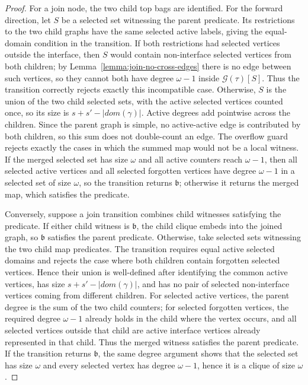 \documentclass[11pt,a4paper]{article}
\newcommand{\decompositiongraph}[1]{\mathcal{G}(#1)}
\newcommand{\abstractdecomposition}{\tau}
\newcommand{\domain}{dom}
\newcommand{\cliqueparameter}{\omega}
\newcommand{\cliquemap}{\gamma}
\newcommand{\cliquesize}{s}
\newcommand{\cliquefound}{\mathfrak{b}}
\newcommand{\vertexsub}{S}
\begin{document}
{\begin{proof}
					For a join node, the two child top bags are identified. For the forward direction, let $\vertexsub$ be a selected set witnessing the parent predicate. Its restrictions to the two child graphs have the same selected active labels, giving the equal-domain condition in the transition. If both restrictions had selected vertices outside the interface, then $\vertexsub$ would contain non-interface selected vertices from both children; by Lemma~\ref{lemma:join-no-cross-edges} there is no edge between such vertices, so they cannot both have degree $\cliqueparameter-1$ inside $\decompositiongraph{\abstractdecomposition}[\vertexsub]$. Thus the transition correctly rejects exactly this incompatible case. Otherwise, $\vertexsub$ is the union of the two child selected sets, with the active selected vertices counted once, so its size is $\cliquesize+\cliquesize'-|\domain(\cliquemap)|$. Active degrees add pointwise across the children. Since the parent graph is simple, no active-active edge is contributed by both children, so this sum does not double-count an edge. The overflow guard rejects exactly the cases in which the summed map would not be a local witness. If the merged selected set has size $\cliqueparameter$ and all active counters reach $\cliqueparameter-1$, then all selected active vertices and all selected forgotten vertices have degree $\cliqueparameter-1$ in a selected set of size $\cliqueparameter$, so the transition returns $\cliquefound$; otherwise it returns the merged map, which satisfies the predicate.

					Conversely, suppose a join transition combines child witnesses satisfying the predicate. If either child witness is $\cliquefound$, the child clique embeds into the joined graph, so $\cliquefound$ satisfies the parent predicate. Otherwise, take selected sets witnessing the two child map predicates. The transition requires equal active selected domains and rejects the case where both children contain forgotten selected vertices. Hence their union is well-defined after identifying the common active vertices, has size $\cliquesize+\cliquesize'-|\domain(\cliquemap)|$, and has no pair of selected non-interface vertices coming from different children. For selected active vertices, the parent degree is the sum of the two child counters; for selected forgotten vertices, the required degree $\cliqueparameter-1$ already holds in the child where the vertex occurs, and all selected vertices outside that child are active interface vertices already represented in that child. Thus the merged witness satisfies the parent predicate. If the transition returns $\cliquefound$, the same degree argument shows that the selected set has size $\cliqueparameter$ and every selected vertex has degree $\cliqueparameter-1$, hence it is a clique of size $\cliqueparameter$.


\end{proof}}
\end{document}
